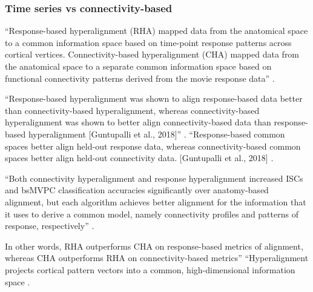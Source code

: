\subsubsection{Time series vs connectivity-based}






%
``Response-based hyperalignment (RHA) mapped data from the anatomical space to a
common information space based on time-point response patterns across cortical
vertices.
%
Connectivity-based hyperalignment (CHA) mapped data from the
anatomical space to a separate common information space based on functional
connectivity patterns derived from the movie response data''
\citep{busch2021hybrid}.

``Response-based hyperalignment was shown to align response-based data better
than connectivity-based hyperalignment, whereas connectivity-based
hyperalignment was shown to better align connectivity-based data than
response-based hyperalignment [Guntupalli et al., 2018]''
\citep{busch2021hybrid}.
%
``Response-based common spaces better align held-out response data, whereas
connectivity-based common spaces better align held-out connectivity data.
[Guntupalli et al., 2018] \citep{busch2021hybrid}.

%
``Both connectivity hyperalignment and response hyperalignment increased ISCs
and bsMVPC classification accuracies significantly over anatomy-based alignment,
but each algorithm achieves better alignment for the information that it uses to
derive a common model, namely connectivity profiles and patterns of response,
respectively'' \citep{guntupalli2018computational}.


%
In other words, RHA outperforms CHA on response-based metrics of alignment,
whereas CHA outperforms RHA on connectivity-based metrics'' ``Hyperalignment
projects cortical pattern vectors into a common, high-dimensional information
space \citep{haxby2020hyperalignment}.

